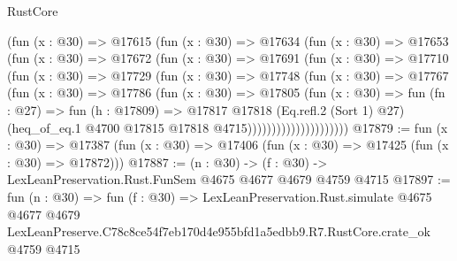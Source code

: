 \begin{lexlean}{RustCore}
\begin{coremodule}
                    (fun (x : @30) =>
                    @17615
                      (fun (x : @30) =>
                      @17634
                        (fun (x : @30) =>
                        @17653
                          (fun (x : @30) =>
                          @17672
                            (fun (x : @30) =>
                            @17691
                              (fun (x : @30) =>
                              @17710
                                (fun (x : @30) =>
                                @17729
                                  (fun (x : @30) =>
                                  @17748
                                    (fun (x : @30) =>
                                    @17767
                                      (fun (x : @30) =>
                                      @17786
                                        (fun (x : @30) =>
                                        @17805
                                          (fun (x : @30) =>
                                          fun (fn : @27) =>
                                          fun (h : @17809) =>
                                          @17817
                                            @17818
                                            (Eq.refl.{2} (Sort 1) @27)
                                            (heq_of_eq.{1}
                                              @4700
                                              @17815
                                              @17818
                                              @4715)))))))))))))))))))))
@17879 := fun (x : @30) =>
  @17387 (fun (x : @30) => @17406 (fun (x : @30) => @17425 (fun (x : @30) => @17872)))
@17887 := (n : @30) -> (f : @30) -> LexLeanPreservation.Rust.FunSem @4675 @4677 @4679 @4759 @4715
@17897 := fun (n : @30) =>
  fun (f : @30) =>
  LexLeanPreservation.Rust.simulate
    @4675
    @4677
    @4679
    LexLeanPreserve.C78c8ce54f7eb170d4e955bfd1a5edbb9.R7.RustCore.crate_ok
    @4759
    @4715
\end{coremodule}
\end{lexlean}
